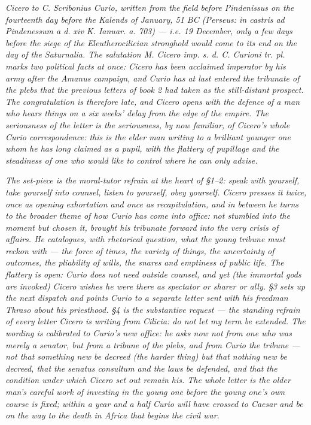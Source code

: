 
\textit{Cicero to C. Scribonius Curio, written from the field
before Pindenissus on the fourteenth day before the Kalends of
January, 51 BC (Perseus: \textit{in castris ad Pindenessum a d.
xiv K. Ianuar. a. 703}) --- i.e. 19 December, only a few days
before the siege of the Eleutherocilician stronghold would come
to its end on the day of the Saturnalia. The salutation
\textit{M. Cicero imp. s. d. C. Curioni tr. pl.} marks two
political facts at once: Cicero has been acclaimed imperator by
his army after the Amanus campaign, and Curio has at last
entered the tribunate of the plebs that the previous letters
of book 2 had taken as the still-distant prospect. The
congratulation is therefore late, and Cicero opens with the
defence of a man who hears things on a six weeks' delay from the
edge of the empire. The seriousness of the letter is the
seriousness, by now familiar, of Cicero's whole Curio
correspondence: this is the elder man writing to a brilliant
younger one whom he has long claimed as a pupil, with the
flattery of pupillage and the steadiness of one who would like
to control where he can only advise.}

\textit{The set-piece is the moral-tutor refrain at the heart of
\S 1--2: speak with yourself, take yourself into counsel, listen
to yourself, obey yourself. Cicero presses it twice, once as
opening exhortation and once as recapitulation, and in between
he turns to the broader theme of how Curio has come into office:
not stumbled into the moment but chosen it, brought his
tribunate forward into the very crisis of affairs. He
catalogues, with rhetorical question, what the young tribune
must reckon with --- the force of times, the variety of things,
the uncertainty of outcomes, the pliability of wills, the snares
and emptiness of public life. The flattery is open: Curio does
not need outside counsel, and yet (the immortal gods are
invoked) Cicero wishes he were there as spectator or sharer or
ally. \S 3 sets up the next dispatch and points Curio to a
separate letter sent with his freedman Thraso about his
priesthood. \S 4 is the substantive request --- the standing
refrain of every letter Cicero is writing from Cilicia: do not
let my term be extended. The wording is calibrated to Curio's
new office: he asks now not from one who was merely a senator,
but from a tribune of the plebs, and from Curio the tribune ---
not that something new be decreed (the harder thing) but that
nothing new be decreed, that the senatus consultum and the laws
be defended, and that the condition under which Cicero set out
remain his. The whole letter is the older man's careful work of
investing in the young one before the young one's own course is
fixed; within a year and a half Curio will have crossed to
Caesar and be on the way to the death in Africa that begins the
civil war.}
